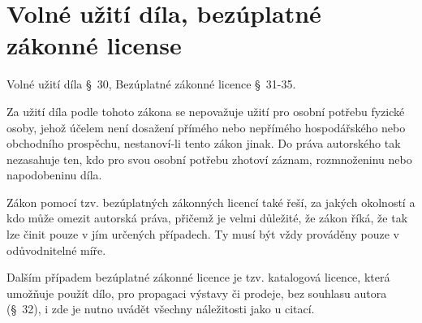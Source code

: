 \section{Volné užití díla, bezúplatné zákonné license}
Volné užití díla §~30, Bezúplatné zákonné licence §~31-35.

Za užití díla podle tohoto zákona se nepovažuje užití pro osobní potřebu fyzické osoby, jehož účelem není dosažení 
přímého nebo nepřímého hospodářského nebo obchodního prospěchu, nestanoví-li tento zákon jinak. Do práva autorského tak 
nezasahuje ten, kdo pro svou osobní potřebu zhotoví záznam, rozmnoženinu nebo napodobeninu díla.

Zákon pomocí tzv. bezúplatných zákonných licencí také řeší, za jakých okolností a kdo může omezit autorská práva, 
přičemž je velmi důležité, že zákon říká, že tak lze činit pouze v jím určených případech. Ty musí být vždy prováděny 
pouze v odůvodnitelné míře.

Dalším případem bezúplatné zákonné licence je tzv. katalogová licence, která umožňuje použít dílo, pro
propagaci výstavy či prodeje, bez souhlasu autora (§~32), i zde je nutno uvádět všechny náležitosti jako u citací.